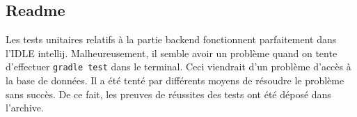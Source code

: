 \subsection{Readme}
\begin{flushleft}
Les tests unitaires relatifs à la partie backend fonctionnent parfaitement dans l'IDLE intellij. Malheureusement, il semble avoir un problème quand on tente d'effectuer \texttt{gradle test} dans le terminal. Ceci viendrait d'un problème d'accès à la base de données. Il a été tenté par différents moyens de résoudre le problème sans succès. De ce fait, les preuves de réussites des tests ont été déposé dans l'archive. 
\end{flushleft}
